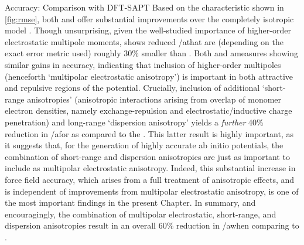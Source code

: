 \begin{subsection}{Accuracy: Comparison with DFT-SAPT}
Based on the characteristic \rmse shown in \cref{fig:rmse}, both \isaff
and \mastiff offer substantial improvements over the completely isotropic model
\isoff. Though unsurprising, given the well-studied importance of higher-order
electrostatic multipole moments, \isaff shows reduced \rmse/a\rmse that are (depending on the exact
error metric used)
roughly 30\% smaller than \isoff. 
Both \rmse and a\rmse measures showing similar gains in accuracy,
indicating that inclusion of higher-order multipoles (henceforth
`multipolar electrostatic anisotropy') is important in both
attractive and repulsive regions of the potential. Crucially, inclusion of
additional `short-range anisotropies' (anisotropic
interactions arising from overlap of monomer electron densities, namely
exchange-repulsion and electrostatic/inductive charge penetration) and
long-range `dispersion anisotropy' yields a \emph{further} 40\% reduction in
\rmse/a\rmse for \mastiff as compared to the \isaff.
This latter
result is highly important, as it suggests that, for the generation of highly
accurate ab initio potentials, the combination of short-range
and dispersion anisotropies 
are just as important to include as
multipolar electrostatic anisotropy. Indeed, this substantial increase in
force field accuracy, which arises from a full treatment of anisotropic
effects, and is independent of improvements from multipolar electrostatic anisotropy, 
is one of the most important findings in the present Chapter.
In summary, and encouragingly, the combination of multipolar electrostatic, short-range, and
dispersion anisotropies result in an overall 60\% reduction in \rmse/a\rmse when
comparing \isoff to \mastiff. 


\end{subsection}
